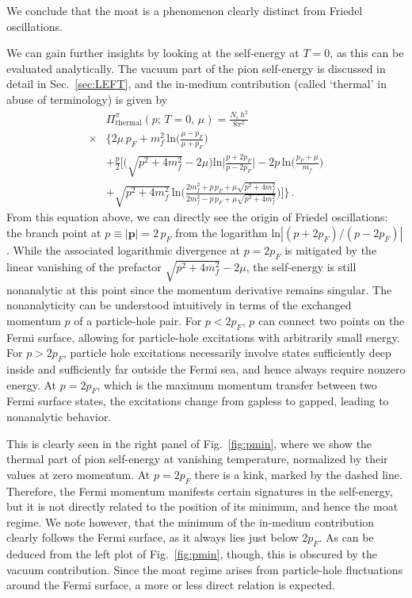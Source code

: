 \documentclass[reprint,english,superscriptaddress,preprintnumbers,amsmath,amssymb,aps,prd]{revtex4-2}
\def\Fig#1{Fig.~\ref{#1}}
\def\Sec#1{Sec.~\ref{#1}}
\begin{document}
We conclude that the moat is a phenomenon clearly distinct from Friedel oscillations. 

We can gain further insights by looking at the self-energy at $T = 0$, as this can be evaluated analytically. The vacuum part of the pion self-energy is discussed in detail in \Sec{sec:LEFT}, and the in-medium contribution (called `thermal' in abuse of terminology) is given by
%
\begin{align}
&\Pi^\pi_{\mathrm{thermal}}(p;\,T=0,\,\mu)=\frac{N_c\,h^2}{8\pi^2}\nonumber\\[2ex]
\times&\bigg\{2\mu\,p_F+m^2_f\,\mathrm{ln}\bigg(\frac{\mu-p_F}{\mu+p_F}\bigg)\nonumber\\[2ex]
&+\frac{p}{2}\bigg[\big(\sqrt{p^2+4m^2_f}-2\mu\big)\mathrm{ln}\bigg|\frac{p+2p_F}{p-2p_F}\bigg|-2p\,\mathrm{ln}\bigg(\frac{p_F+\mu}{m_f}\bigg)\nonumber\\[2ex]
&+\sqrt{p^2+4m^2_f}\,\mathrm{ln}\bigg(\frac{2m^2_f+p\,p_F+\mu\sqrt{p^2+4m^2_f}}{2m^2_f-p\,p_F+\mu\sqrt{p^2+4m^2_f}}\bigg)\bigg]\bigg\}\,.\label{eq:Pi_T0_mu}
\end{align}
%
From this equation above, we can directly see the origin of Friedel oscillations: the branch point at $p \equiv |\mathbf{p}|=2\,p_F$ from the logarithm $\mathrm{ln}|(p+2p_F)/(p-2p_F)|$. While the associated logarithmic divergence at $p=2p_F$ is mitigated by the linear vanishing of the prefactor $\sqrt{p^2+4m^2_f}-2\mu$, the self-energy is still nonanalytic at this point since the momentum derivative remains singular. 
The nonanalyticity can be understood intuitively in terms of the exchanged momentum $p$ of a particle-hole pair. For $p < 2 p_F$, $p$ can connect two points on the Fermi surface, allowing for particle-hole excitations with arbitrarily small energy. For $p > 2 p_F$, particle hole excitations necessarily involve states sufficiently deep inside and sufficiently far outside the Fermi sea, and hence always require nonzero energy. At $p=2p_F$, which is the maximum momentum transfer between two Fermi surface states, the excitations change from gapless to gapped, leading to nonanalytic behavior.


This is clearly seen in the right panel of \Fig{fig:pmin}, where we show the thermal part of pion self-energy at vanishing temperature, normalized by their values at zero momentum. At $p=2p_F$ there is a kink, marked by the dashed line. Therefore, the Fermi momentum manifests certain signatures in the self-energy, but it is not directly related to the position of its minimum, and hence the moat regime. We note however, that the minimum of the in-medium contribution clearly follows the Fermi surface, as it always lies just below $2 p_F$. As can be deduced from the left plot of \Fig{fig:pmin}, though, this is obscured by the vacuum contribution. Since the moat regime arises from particle-hole fluctuations around the Fermi surface, a more or less direct relation is expected.
\end{document}
